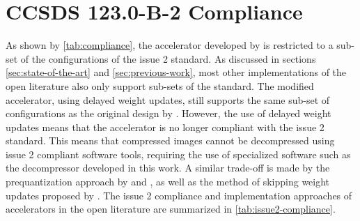 \section{CCSDS 123.0-B-2 Compliance}

As shown by \autoref{tab:compliance}, the accelerator developed by \citeauthor{vorhaugHyperspectralImageCompression2024} is restricted to a sub-set of the configurations of the issue 2 standard. As discussed in sections \ref{sec:state-of-the-art} and \ref{sec:previous-work}, most other implementations of the open literature also only support sub-sets of the standard. The modified accelerator, using delayed weight updates, still supports the same sub-set of configurations as the original design by \citeauthor{vorhaugHyperspectralImageCompression2024}. However, the use of delayed weight updates means that the accelerator is no longer compliant with the issue 2 standard. This means that compressed images cannot be decompressed using issue 2 compliant software tools, requiring the use of specialized software such as the decompressor developed in this work. A similar trade-off is made by the prequantization approach by \citeauthor{chatziantoniouScalableDataRateNearLossless2022a} and \citeauthor{valsesiaHighThroughputOnboardHyperspectral2019}, as well as the method of skipping weight updates proposed by \citeauthor{barriosRemovingDataDependencies2024}. The issue 2 compliance and implementation approaches of accelerators in the open literature are summarized in \autoref{tab:issue2-compliance}.

